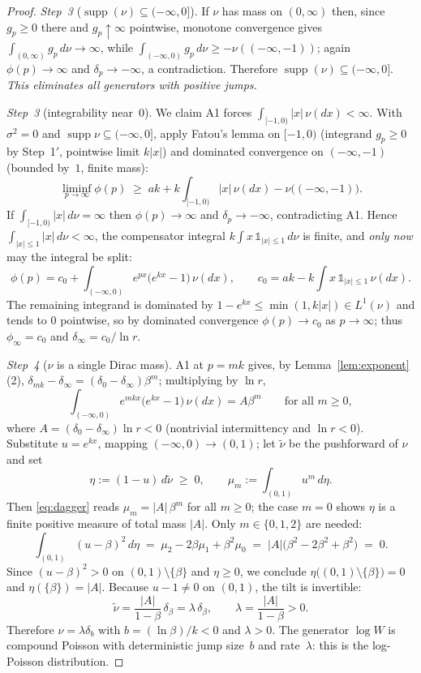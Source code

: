 \documentclass[10pt,a4paper]{amsart}
\DeclareMathOperator{\supp}{supp}
\begin{document}
\begin{proof}
\textit{Step~3} ($\supp(\nu) \subseteq (-\infty,0]$).  If $\nu$ has
mass on $(0,\infty)$ then, since $g_p \ge 0$ there and $g_p \uparrow
\infty$ pointwise, monotone convergence gives $\int_{(0,\infty)}
g_p\,d\nu \to \infty$, while $\int_{(-\infty,0)} g_p\,d\nu \ge
-\nu((-\infty,-1))$; again $\phi(p) \to \infty$ and $\delta_p \to
-\infty$, a contradiction.  Therefore $\supp(\nu) \subseteq
(-\infty,0]$.  \textit{This eliminates all generators with positive
jumps.}

\textit{Step~3\textonehalf} (integrability near~$0$).  We claim A1
forces $\int_{[-1,0)} |x|\,\nu(dx) < \infty$.  With $\sigma^2 = 0$
and $\supp\nu \subseteq (-\infty,0]$, apply Fatou's lemma on
$[-1,0)$ (integrand $g_p \ge 0$ by Step~1$'$, pointwise limit
$k|x|$) and dominated convergence on $(-\infty,-1)$ (bounded by~$1$,
finite mass):
\[
  \liminf_{p\to\infty} \phi(p)
  \;\ge\; ak + k\int_{[-1,0)} |x|\,\nu(dx)
  - \nu\bigl((-\infty,-1)\bigr).
\]
If $\int_{[-1,0)}|x|\,d\nu = \infty$ then $\phi(p) \to \infty$ and
$\delta_p \to -\infty$, contradicting A1.  Hence
$\int_{|x|\le1}|x|\,d\nu < \infty$, the compensator integral
$k\int x\,\mathds{1}_{|x|\le1}\,d\nu$ is finite, and \emph{only now}
may the integral be split:
\[
  \phi(p) = c_0 + \int_{(-\infty,0)} e^{px}\bigl(e^{kx}-1\bigr)
  \,\nu(dx),
  \qquad
  c_0 = ak - k\!\int x\,\mathds{1}_{|x|\leq 1}\,\nu(dx).
\]
The remaining integrand is dominated by $1 - e^{kx} \le
\min(1, k|x|) \in L^1(\nu)$ and tends to $0$ pointwise, so by
dominated convergence $\phi(p) \to c_0$ as $p \to \infty$; thus
$\phi_\infty = c_0$ and $\delta_\infty = c_0/\ln r$.

\textit{Step~4} ($\nu$ is a single Dirac mass).  A1 at $p = mk$
gives, by Lemma~\ref{lem:exponent}(2),
$\delta_{mk} - \delta_\infty = (\delta_0-\delta_\infty)\beta^m$;
multiplying by $\ln r$,
\begin{equation}\label{eq:dagger}
  \int_{(-\infty,0)} e^{mkx}\bigl(e^{kx}-1\bigr)\,\nu(dx)
  = A\beta^m
  \qquad\text{for all } m \geq 0,
\end{equation}
where $A = (\delta_0 - \delta_\infty)\ln r < 0$ (nontrivial
intermittency and $\ln r < 0$).  Substitute $u = e^{kx}$, mapping
$(-\infty,0) \to (0,1)$; let $\tilde\nu$ be the pushforward of $\nu$
and set
\[
  \eta := (1-u)\,d\tilde\nu \;\ge\; 0,
  \qquad
  \mu_m := \int_{(0,1)} u^m \, d\eta .
\]
Then \eqref{eq:dagger} reads $\mu_m = |A|\,\beta^m$ for all $m \ge
0$; the case $m=0$ shows $\eta$ is a finite positive measure of
total mass $|A|$.  Only $m \in \{0,1,2\}$ are needed:
\[
  \int_{(0,1)} (u-\beta)^2 \, d\eta
  \;=\; \mu_2 - 2\beta\mu_1 + \beta^2\mu_0
  \;=\; |A|\bigl(\beta^2 - 2\beta^2 + \beta^2\bigr)
  \;=\; 0 .
\]
Since $(u-\beta)^2 > 0$ on $(0,1)\setminus\{\beta\}$ and $\eta \ge
0$, we conclude $\eta\bigl((0,1)\setminus\{\beta\}\bigr) = 0$ and
$\eta(\{\beta\}) = |A|$.  Because $u - 1 \neq 0$ on $(0,1)$, the
tilt is invertible:
\[
  \tilde\nu = \frac{|A|}{1-\beta}\,\delta_\beta
  = \lambda\,\delta_\beta,
  \qquad \lambda = \frac{|A|}{1-\beta} > 0 .
\]
Therefore $\nu = \lambda\delta_b$ with $b = (\ln\beta)/k < 0$ and
$\lambda > 0$.  The generator $\log W$ is compound Poisson with
deterministic jump size~$b$ and rate~$\lambda$: this is the
log-Poisson distribution.
\end{proof}
\end{document}
